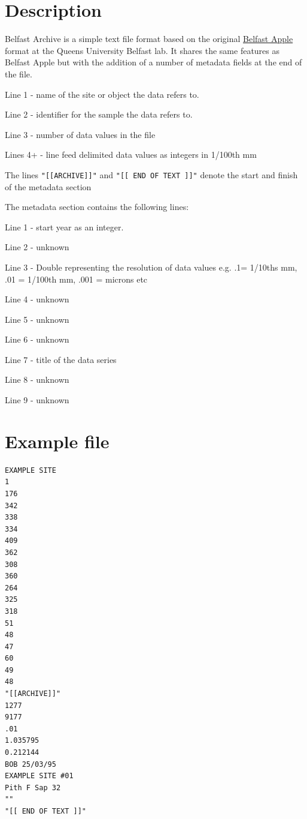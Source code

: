 \section{Description}

Belfast Archive is a simple text file format based on the original \hyperref[summary:belfastApple]{Belfast Apple} format at the Queens University Belfast lab. It shares the same features as Belfast Apple but with the addition of a number of metadata fields at the end of the file.

\begin{itemize*}
 \item Line 1 - name of the site or object the data refers to.
 \item Line 2 - identifier for the sample the data refers to.
 \item Line 3 - number of data values in the file
 \item Lines 4+ - line feed delimited data values as integers in 1/100th mm
 \item The lines \verb|"[[ARCHIVE]]"| and \verb|"[[ END OF TEXT ]]"| denote the start and finish of the metadata section  
\end{itemize*}

The metadata section contains the following lines:

\begin{itemize*}
    \item  Line 1 - start year as an integer.
    \item  Line 2 - unknown
    \item  Line 3 - Double representing the resolution of data values e.g. .1= 1/10ths mm, .01 = 1/100th mm, .001 = microns etc
    \item  Line 4 - unknown
    \item  Line 5 - unknown
    \item  Line 6 - unknown
    \item  Line 7 - title of the data series
    \item  Line 8 - unknown
    \item  Line 9 - unknown 
\end{itemize*}

\section{Example file}

\begin{lstlisting}
EXAMPLE SITE
1
176
342
338
334
409
362
308
360
264
325
318
51
48
47
60
49
48
"[[ARCHIVE]]"
1277
9177
.01
1.035795
0.212144
BOB 25/03/95
EXAMPLE SITE #01
Pith F Sap 32
""
"[[ END OF TEXT ]]"
\end{lstlisting}


